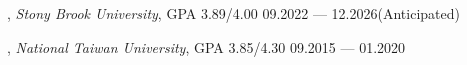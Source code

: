 


, \textit{Stony Brook University}, GPA 3.89/4.00	\hfill 09.2022 --- 12.2026(Anticipated)

, \textit{National Taiwan University}, GPA 3.85/4.30 \hfill	09.2015 --- 01.2020
